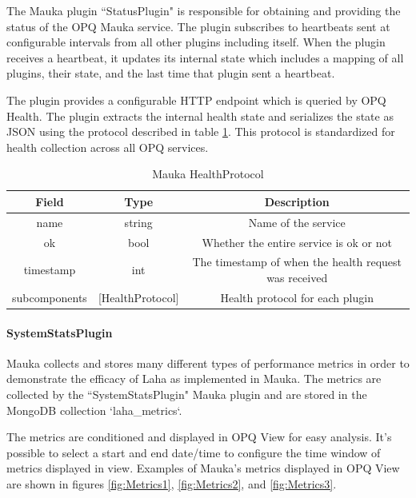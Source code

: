 The Mauka plugin ``StatusPlugin" is responsible for obtaining and providing the status of the OPQ Mauka service. The plugin subscribes to heartbeats sent at configurable intervals from all other plugins including itself. When the plugin receives a heartbeat, it updates its internal state which includes a mapping of all plugins, their state, and the last time that plugin sent a heartbeat. 

The plugin provides a configurable HTTP endpoint which is queried by OPQ Health. The plugin extracts the internal health state and serializes the state as JSON using the protocol described in table \ref{table:HealthProtocol}. This protocol is standardized for health collection across all OPQ services.

\begin{table}[H]
	\centering
	\caption{Mauka HealthProtocol}
	\begin{tabular}{|c|c|c|}
		\hline 
		Field & Type & Description \\ 
		\hline
		name & string & Name of the service \\
		\hline
		ok & bool & Whether the entire service is ok or not \\
		\hline
		timestamp & int & The timestamp of when the health request was received \\
		\hline
		subcomponents & [HealthProtocol] & Health protocol for each plugin \\
		\hline
	\end{tabular} 
	\label{table:HealthProtocol}
\end{table}

\paragraph{SystemStatsPlugin}\label{lbl:SystemStatsPlugin}
Mauka collects and stores many different types of performance metrics in order to demonstrate the efficacy of Laha as implemented in Mauka. The metrics are collected by the ``SystemStatsPlugin" Mauka plugin and are stored in the MongoDB collection `laha\_metrics`. 

The metrics are conditioned and displayed in OPQ View for easy analysis. It's possible to select a start and end date/time to configure the time window of metrics displayed in view. Examples of Mauka's metrics displayed in OPQ View are shown in figures \ref{fig:Metrics1}, \ref{fig:Metrics2}, and \ref{fig:Metrics3}.

